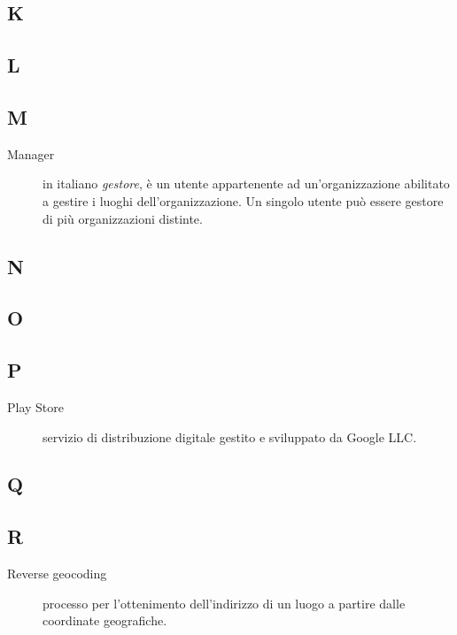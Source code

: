 \documentclass[../manuale-utente.tex]{subfiles}
\begin{document}
\subsection{K}

\subsection{L}

\subsection{M}
\begin{description}
    \item[Manager] in italiano \textit{gestore}, è un utente appartenente ad un'organizzazione abilitato a gestire i luoghi dell'organizzazione. Un singolo utente può essere gestore di più organizzazioni distinte.
\end{description}

\subsection{N}

\subsection{O}

\subsection{P}
\begin{description}
    \item[Play Store] servizio di distribuzione digitale gestito e sviluppato da Google LLC\@.
\end{description}

\subsection{Q}

\subsection{R}
\begin{description}
    \item[Reverse geocoding] processo per l'ottenimento dell'indirizzo di un luogo a partire dalle coordinate geografiche.
\end{description}
\end{document}
